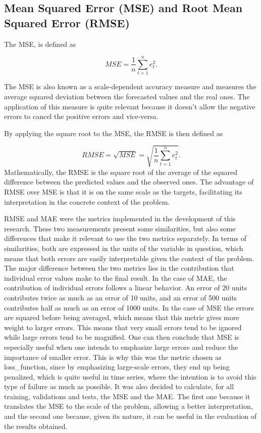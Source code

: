 \subsection{Mean Squared Error (MSE) and Root Mean Squared Error (RMSE)}

The \ac{MSE}, is defined as

\begin{equation}
     MSE =\frac {1}{n}\sum_{t=1}^ne_t^2.
\label{mse}
\end{equation}

The \ac{MSE} is also known as a scale-dependent accuracy measure and measures the average squared deviation between the forecasted values and the real ones. The application of this measure is quite relevant because it doesn't allow the negative errors to cancel the positive errors and vice-versa. 

By applying the square root to the \ac{MSE}, the \ac{RMSE} is then defined as

\begin{equation}
     RMSE =\sqrt{MSE} = \sqrt{\frac {1}{n}\sum_{t=1}^ne_t^2}.
\label{rmse}
\end{equation}
Mathematically, the \ac{RMSE} is the square root of the average of the squared difference between the predicted values and the observed ones. The advantage of \ac{RMSE} over \ac{MSE} is that it is on the same scale as the targets, facilitating its interpretation in the concrete context of the problem. 

\ac{RMSE} and \ac{MAE} were the metrics implemented in the development of this research. These two measurements present some similarities, but also some differences that make it relevant to use the two metrics separately. In terms of similarities, both are expressed in the units of the variable in question, which means that both errors are easily interpretable given the context of the problem. The major difference between the two metrics lies in the contribution that individual error values make to the final result. In the case of \ac{MAE}, the contribution of individual errors follows a linear behavior. An error of 20 units contributes twice as much as an error of 10 units, and an error of 500 units contributes half as much as an error of 1000 units. In the case of \ac{MSE} the errors are squared before being averaged, which means that this metric gives more weight to larger errors.  This means that very small errors tend to be ignored while large errors tend to be magnified. One can then conclude that \ac{MSE} is especially useful when one intends to emphasize large errors and reduce the importance of smaller error. This is why this was the metric chosen as loss\_function, since by emphasizing large-scale errors, they end up being penalized, which is quite useful in time series, where the intention is to avoid this type of failure as much as possible. It was also decided to calculate, for all training, validations and tests, the \ac{MSE} and the \ac{MAE}. The first one because it translates the \ac{MSE} to the scale of the problem, allowing a better interpretation, and the second one because, given its nature, it can be useful in the evaluation of the results obtained.

